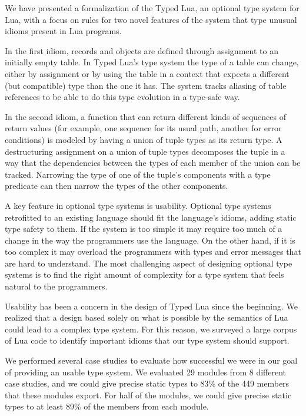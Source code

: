 \documentclass{sigplanconf}
\begin{document}
We have presented a formalization of the Typed Lua,
an optional type system for Lua, with a focus on rules
for two novel features of the system that type unusual
idioms present in Lua programs.

In the first idiom, records and objects are
defined through assignment to an initially empty
table. In Typed Lua's type system the type of a
table can change, either by assignment
or by using the table in a context that expects
a different (but compatible) type than the one it
has. The system tracks aliasing of table references
to be able to do this type evolution in a type-safe
way.

In the second idiom, a function that can return different
kinds of sequences of return values (for example, one
sequence for its usual path, another for error conditions)
is modeled by having a union of tuple types as its return
type. A destructuring assignment on a union of tuple types
decomposes the tuple in a way that the dependencies between
the types of each member of the union can be tracked.
Narrowing the type of one of the tuple's components with
a type predicate can then narrow the types of the other
components.

A key feature in optional type systems is usability.
Optional type systems retrofitted to an existing
language should fit the language's idioms, adding
static type safety to them. If the system is too
simple it may require too much of a change in the way
the programmers use the language. On the other hand,
if it is too complex it may overload the programmers
with types and error messages that are hard to
understand. The most challenging aspect of designing optional type systems is to find the right amount of complexity for a type system that feels natural to the programmers.

Usability has been a concern in the design of Typed Lua since the beginning. We realized that a design based solely on what
is possible by the semantics of Lua could lead to a 
complex type system. For this reason, we surveyed a large
corpus of Lua code to identify important idioms that
our type system should support.

We performed several
case studies to evaluate how successful we were in our goal of
providing an usable type system.
We evaluated 29 modules from 8 different case studies,
and we could give precise static types to 83\% of the 449
members that these modules export.
For half of the modules, we could give precise static types to
at least 89\% of the members from each module.
\end{document}
